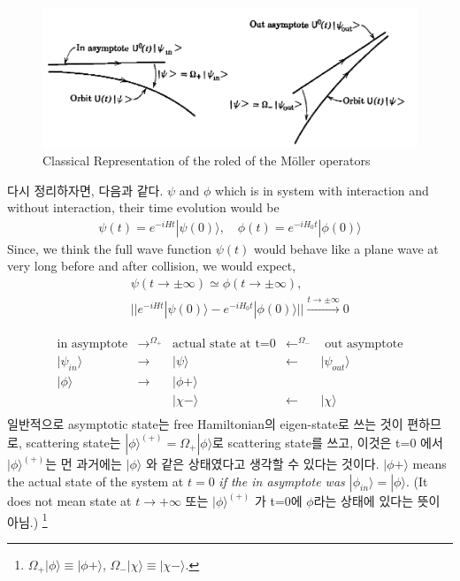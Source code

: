 \documentclass[10pt]{book}
\newcommand{\bea}{\begin{eqnarray}}
\newcommand{\eea}{\end{eqnarray}}
\newcommand{\no}{\nonumber \\}
\def\ra{\rangle}
\begin{document}
\begin{figure}
	\centering
	\includegraphics[width=0.7\linewidth]{inout_taylor}
	\caption{Classical Representation of the roled of the M\"{o}ller operators}
	\label{fig:inouttaylor}
\end{figure}



다시 정리하자면, 다음과 같다. $\psi$ and $\phi$ which is in system with interaction and 
without interaction, their time evolution would be
\bea
\psi(t)= e^{-iHt}|\psi(0)\ra,\quad \phi(t)=e^{-iH_0 t}|\phi(0)\ra  
\eea 
Since, we think the full wave function $\psi(t)$ would behave like a 
plane wave at very long before and after collision, we would expect,
\bea 
& &\psi(t \to \pm \infty)\simeq \phi (t\to \pm \infty),\no   
& & || e^{-iHt}|\psi(0)\ra -e^{-iH_0 t}|\phi(0)\ra ||\xrightarrow{t\to \pm \infty} 0
\eea 

\begin{equation}
\boxed{
\begin{array}{ccccc}
\mbox{in asymptote} & \rightarrow^{\Omega_+} & \mbox{actual state at t=0}
                    & \leftarrow^{\Omega_-}  & \mbox{ out asymptote}\\
|\psi_{in}\ra       & \rightarrow            & |\psi\ra 
                    &\leftarrow              & |\psi_{out}\ra\\
|\phi\ra            &\rightarrow             &|\phi+\ra
                    &                        &  \\
                    &                        & |\chi-\ra
                    & \leftarrow             & |\chi\ra\\       
\end{array}
}
\end{equation}
일반적으로 asymptotic state는 free Hamiltonian의 eigen-state로 쓰는 것이 편하므로,
scattering state는 $|\phi\ra^{(+)}=\Omega_{+}|\phi\ra$로 scattering state를 
쓰고, 이것은 t=0 에서 $|\phi\ra^{(+)}$는 먼 과거에는 $|\phi\ra$ 와 같은 상태였다고 
생각할 수 있다는 것이다. $|\phi+\ra$ means the actual state of the system at $t=0$
{\it if the in asymptote was $|\phi_{in}\ra=|\phi\ra$}.
(It does not mean state at $t\to +\infty$ 또는 $|\phi\ra^{(+)}$ 가 t=0에 
$\phi$라는 상태에 있다는 뜻이 아님.)
\footnote{$\Omega_{+}|\phi\ra\equiv |\phi+\ra$,
$\Omega_{-}|\chi\ra\equiv |\chi-\ra$.}
\end{document}

